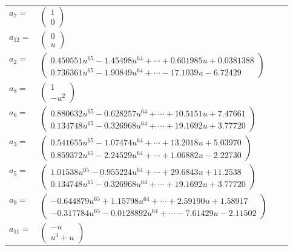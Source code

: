 \documentclass[1p]{elsarticle_modified}
\theoremstyle{definition}
\begin{document}
\begin{tabular}{m{7pt} m{180pt} m{7pt} m{180pt} }
\flushright $a_{7}=$&$\begin{pmatrix}1\\0\end{pmatrix}$ \\
\flushright $a_{12}=$&$\begin{pmatrix}0\\u\end{pmatrix}$ \\
\flushright $a_{2}=$&$\begin{pmatrix}0.450551 u^{65}-1.45498 u^{64}+\cdots+0.601985 u+0.0381388\\0.736361 u^{65}-1.90849 u^{64}+\cdots-17.1039 u-6.72429\end{pmatrix}$ \\
\flushright $a_{8}=$&$\begin{pmatrix}1\\- u^2\end{pmatrix}$ \\
\flushright $a_{6}=$&$\begin{pmatrix}0.880632 u^{65}-0.628257 u^{64}+\cdots+10.5151 u+7.47661\\0.134748 u^{65}-0.326968 u^{64}+\cdots+19.1692 u+3.77720\end{pmatrix}$ \\
\flushright $a_{3}=$&$\begin{pmatrix}0.541655 u^{65}-1.07474 u^{64}+\cdots+13.2018 u+5.03970\\0.859372 u^{65}-2.24529 u^{64}+\cdots+1.06882 u-2.22730\end{pmatrix}$ \\
\flushright $a_{5}=$&$\begin{pmatrix}1.01538 u^{65}-0.955224 u^{64}+\cdots+29.6843 u+11.2538\\0.134748 u^{65}-0.326968 u^{64}+\cdots+19.1692 u+3.77720\end{pmatrix}$ \\
\flushright $a_{9}=$&$\begin{pmatrix}-0.644879 u^{65}+1.15798 u^{64}+\cdots+2.59190 u+1.58917\\-0.317784 u^{65}-0.0128892 u^{64}+\cdots-7.61429 u-2.11502\end{pmatrix}$ \\
\flushright $a_{11}=$&$\begin{pmatrix}- u\\u^3+u\end{pmatrix}$ \\

\end{tabular}
\end{document}
